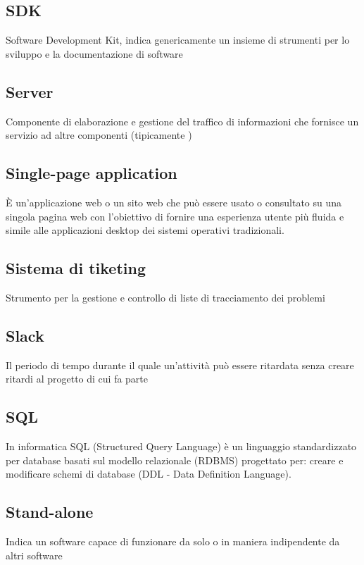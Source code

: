 {{		\subsection{SDK}
		Software Development Kit, indica genericamente un insieme di strumenti per lo sviluppo e la documentazione di software


		\subsection{Server}
		Componente di elaborazione e gestione del traffico di informazioni che fornisce un servizio ad altre componenti (tipicamente )


		\subsection{Single-page application}
		È un'applicazione web o un sito web che può essere usato o consultato su una singola pagina web con l'obiettivo di fornire una esperienza utente più fluida e simile alle applicazioni desktop dei sistemi operativi tradizionali.


		\subsection{Sistema di tiketing}
		Strumento per la gestione e controllo di liste di tracciamento dei problemi


		\subsection{Slack}
		Il periodo di tempo durante il quale un'attività può essere ritardata senza creare ritardi al progetto di cui fa parte


		\subsection{SQL}
		In informatica SQL (Structured Query Language) è un linguaggio standardizzato per database basati sul modello relazionale (RDBMS) progettato per: creare e modificare schemi di database (DDL - Data Definition Language).


		\subsection{Stand-alone}
		Indica un software capace di funzionare da solo o in maniera indipendente da altri software


}}
